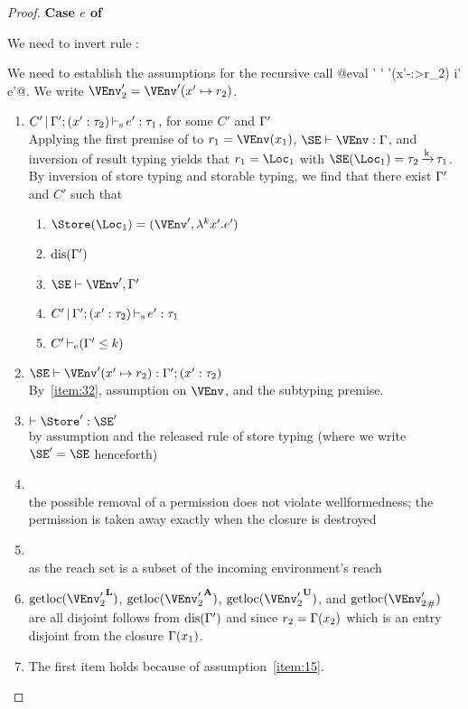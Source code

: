 \begin{proof}
  \newpage{}
  \textbf{Case $e$ of}

  We need to invert rule :
  \begin{mathpar}
  \end{mathpar}

  We need to establish the assumptions for the recursive call
  @eval \Store' \Perm' \VEnv'(x'-:>r_2) i' e'@.
  We write $\VEnv_2' = \VEnv' (x'\mapsto r_2)$.
  \begin{enumerate}[({A1-}1)]
  \item $\inferS{C'}{\E'; \bvar{x'}{\tau_2}}{e'}{\tau_1}$, for some
    $C'$ and $\E'$\\
    Applying the first premise of  to $r_1 = \VEnv
    (x_1)$, $\SE \vdash \VEnv : \E$, and inversion of result typing
    yields that $r_1 = \Loc_1$ with $\SE (\Loc_1) = \tau_2 \tarr{k}
    \tau_1$.
    By inversion of store typing and storable typing, we find that
    there exist $\E'$ and $C'$ such that
    \begin{enumerate}
    \item $\Store (\Loc_1) = (\VEnv', \lam[k]{x'}{e'})$
    \item $\Disjoint{\E'}$
    \item\label{item:32} $\SE \vdash \VEnv', \E'$
    \item $\inferS{C'}{\E';\bvar {x'}{\tau_2}}{e'}{\tau_1}$
    \item $\addlin{\entail{C'}{\Cleq{\E'}{k}}}$
    \end{enumerate}
  \item $\SE \vdash \VEnv' (x' \mapsto r_2) : \E';
    \bvar{x'}{\tau_2}$\\
    By~\ref{item:32}, assumption on $\VEnv$, and the subtyping premise.
  \item $\vdash \Store' : \SE'$ \\
    by assumption and the released rule of store typing (where we
    write $\SE'=\SE$ henceforth)
  \item {} \\
    the possible removal of a permission does not violate
    wellformedness; the permission is taken away exactly when the
    closure is destroyed
  \item
     \\
    as the reach set is a subset of the incoming environment's reach
  \item $\Rawloc{\Active{\VEnv_2'}}$,
    $\Rawloc{\MutableBorrows{\VEnv_2'}}$,
    $\Rawloc{\ImmutableBorrows{\VEnv_2'}}$, and
    $\Rawloc{\Suspended{\VEnv_2'}}$ are all disjoint follows from
    $\Disjoint{\E'}$ and since $r_2= \E (x_2)$ which is an entry
    disjoint from the closure $\E(x_1)$.
  \item {}
    The first item holds because of assumption~\ref{item:15}.


\end{enumerate}
\end{proof}

